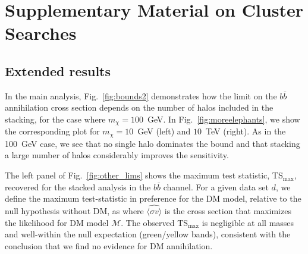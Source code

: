 \chapter{Supplementary Material on Cluster Searches}


\section{Extended results}
\label{sec:extended}

In the main analysis, Fig.~\ref{fig:bounds2}  demonstrates how the limit on the  $b\bar b$ annihilation cross section  depends on the number of halos included in the stacking, for the case where  $m_\chi = 100$~GeV. In Fig.~\ref{fig:moreelephants}, we show the corresponding plot for $m_\chi = 10$~GeV (left) and $10$~TeV (right).  As in the 100~GeV case, we see that no single halo dominates the bound and that stacking a large number of halos considerably improves the sensitivity.

The left panel of Fig.~\ref{fig:other_lims} shows the maximum test statistic, TS$_\text{max}$, recovered for the stacked analysis in the $b\bar{b}$ channel.  For a given data set $d$, we define the maximum test-statistic in preference for the DM model, relative to the null hypothesis without DM, as 
where $\widehat{\langle\sigma v\rangle}$ is the cross section that maximizes the likelihood for DM model $\mathcal{M}$.  The observed TS$_\text{max}$ is negligible at all masses and well-within the null expectation (green/yellow bands), consistent with the conclusion that we find no evidence for DM annihilation.  \vspace{0.1in}

